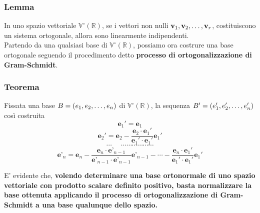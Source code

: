 \documentclass[../main.tex]{subfiles}
\begin{document}
\subsubsection{Lemma}
In uno spazio vettoriale $\mathbb{V}^{\circ}(\mathbb{R})$, se i vettori non
nulli $\textbf{v}_1, \textbf{v}_2, \ldots, \textbf{v}_{r}$, costituiscono un sistema ortogonale, allora sono
linearmente indipendenti.\\ Partendo da una qualsiasi base di
$\mathbb{V}^{\circ}(\mathbb{R})$, possiamo ora costrure una base ortogonale
seguendo il procedimento detto \textbf{processo di ortogonalizzazione di
    Gram-Schmidt}.\\

\subsubsection{Teorema}
Fissata una base $B = (e_1, e_2, \ldots, e_{n})$ di $\mathbb{V}^{\circ}(\mathbb{R})$, la
sequenza $B' = (e'_1, e'_2, \ldots, e'_{n})$ così costruita
\[
    \textbf{e}_1' = \textbf{e}_1
\]
\[
    \textbf{e}_2' = \textbf{e}_2 - \dfrac{\textbf{e}_2\cdot\textbf{e}_1'}{\textbf{e}_1'\cdot\textbf{e}_1'}\textbf{e}_1'
\]
\[
    \cdots \ \ \ \ \ \ \cdots\cdots\cdots\cdots\cdots\cdots
\]
\[
    \textbf{e'}_n = \textbf{e}_n - \dfrac{\textbf{e}_n\cdot\textbf{e'}_{n-1}}{\textbf{e'}_{n-1}\cdot\textbf{e'}_{n-1}}\textbf{e'}_{n-1} - \cdots - \dfrac{\textbf{e}_n\cdot\textbf{e}_1'}{\textbf{e}_1'\cdot\textbf{e}_1'}\textbf{e}_1'
\]

E' evidente che, \textbf{volendo determinare una base ortonormale di uno spazio
    vettoriale con prodotto scalare definito positivo, basta normalizzare la base
    ottenuta applicando il processo di ortogonalizzazione di Gram-Schmidt a una
    base qualunque dello spazio.}
\end{document}
